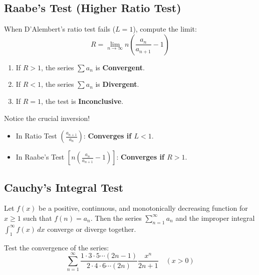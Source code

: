 \subsection{Raabe's Test (Higher Ratio Test)}

\begin{theorem}
When D'Alembert's ratio test fails ($L = 1$), compute the limit:
\begin{equation}
    R = \lim_{n\to\infty} n \left( \frac{a_n}{a_{n+1}} - 1 \right)
\end{equation}
\begin{enumerate}[leftmargin=1.5em]
    \item If $R > 1$, the series $\sum a_n$ is \textbf{Convergent}.
    \item If $R < 1$, the series $\sum a_n$ is \textbf{Divergent}.
    \item If $R = 1$, the test is \textbf{Inconclusive}.
\end{enumerate}
\end{theorem}

\begin{commonmistake}
Notice the crucial inversion!
\begin{itemize}
    \item In Ratio Test $\left(\frac{a_{n+1}}{a_n}\right)$: \textbf{Converges if $L < 1$}.
    \item In Raabe's Test $\left[n\left(\frac{a_n}{a_{n+1}}-1\right)\right]$: \textbf{Converges if $R > 1$}.
\end{itemize}
\end{commonmistake}

\subsection{Cauchy's Integral Test}

\begin{theorem}
Let $f(x)$ be a positive, continuous, and monotonically decreasing function for $x \ge 1$ such that $f(n) = a_n$. Then the series $\sum_{n=1}^\infty a_n$ and the improper integral $\int_1^\infty f(x)\,dx$ converge or diverge together.
\end{theorem}

\begin{example}
Test the convergence of the series:
\begin{equation*}
    \sum_{n=1}^\infty \frac{1 \cdot 3 \cdot 5 \cdots (2n-1)}{2 \cdot 4 \cdot 6 \cdots (2n)} \frac{x^n}{2n+1} \quad (x > 0)
\end{equation*}
\end{example}

